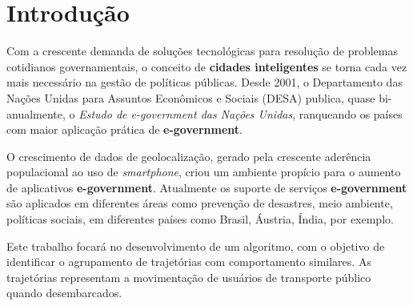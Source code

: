 \chapter[Introdução]{Introdução}

Com a crescente demanda de soluções tecnológicas para resolução de problemas cotidianos governamentais, o conceito de \textbf{cidades inteligentes} se torna cada vez mais necessário na gestão de políticas públicas. Desde 2001, o Departamento das Nações Unidas para Assuntos Econômicos e Sociais (DESA) publica, quase bi-anualmente, o \textit{Estudo de e-government das Nações Unidas}, ranqueando os países com maior aplicação prática de \textbf{e-government}.

O crescimento de dados de geolocalização, gerado pela crescente aderência populacional ao uso de \textit{smartphone}, criou um ambiente propício para o aumento de aplicativos \textbf{e-government}. Atualmente os suporte de serviços \textbf{e-government} são aplicados em diferentes áreas como prevenção de desastres, meio ambiente, políticas sociais, em diferentes países como Brasil, Áustria, Índia, por exemplo.

Este trabalho focará no desenvolvimento de um algoritmo, com o objetivo de identificar o agrupamento de trajetórias com comportamento similares. As trajetórias representam a movimentação de usuários de transporte público quando desembarcados.